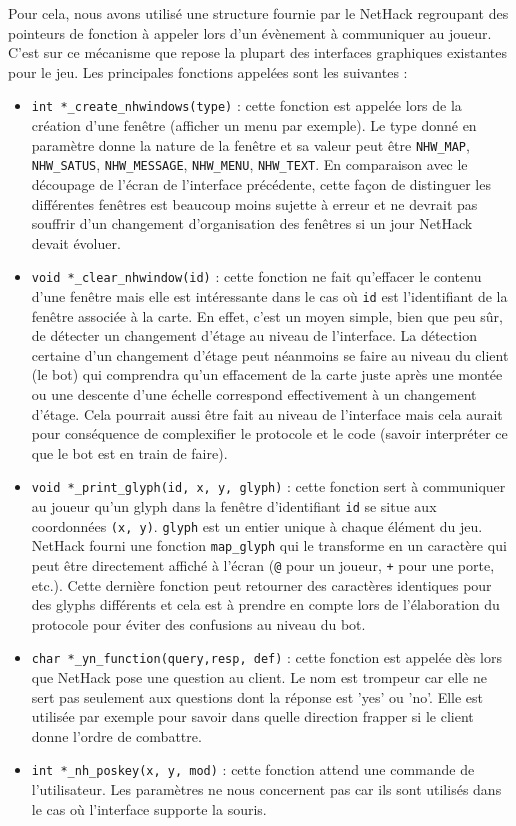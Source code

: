 \documentclass[a4paper,11pt]{article}
\begin{document}
Pour cela, nous avons utilisé une structure fournie par le NetHack regroupant des pointeurs de fonction à appeler lors d'un évènement à communiquer au joueur. C'est sur ce mécanisme que repose la plupart des interfaces graphiques existantes pour le jeu. Les principales fonctions appelées sont les suivantes :
\begin{itemize}
	\item \verb!int *_create_nhwindows(type)! : cette fonction est appelée lors de la création d'une fenêtre (afficher un menu par exemple). Le type donné en paramètre donne la nature de la fenêtre et sa valeur peut être \verb!NHW_MAP!, \verb!NHW_SATUS!, \verb!NHW_MESSAGE!, \verb!NHW_MENU!, \verb!NHW_TEXT!. En comparaison avec le découpage de l'écran de l'interface précédente, cette façon de distinguer les différentes fenêtres est beaucoup moins sujette à erreur et ne devrait pas souffrir d'un changement d'organisation des fenêtres si un jour NetHack devait évoluer.
	\item \verb!void *_clear_nhwindow(id)! : cette fonction ne fait qu'effacer le contenu d'une fenêtre mais elle est intéressante dans le cas où \verb!id! est l'identifiant de la fenêtre associée à la carte. En effet, c'est un moyen simple, bien que peu sûr, de détecter un changement d'étage au niveau de l'interface. La détection certaine d'un changement d'étage peut néanmoins se faire au niveau du client (le bot) qui comprendra qu'un effacement de la carte juste après une montée ou une descente d'une échelle correspond effectivement à un changement d'étage. Cela pourrait aussi être fait au niveau de l'interface mais cela aurait pour conséquence de complexifier le protocole et le code (savoir interpréter ce que le bot est en train de faire).
	\item \verb!void *_print_glyph(id, x, y, glyph)! : cette fonction sert à communiquer au joueur qu'un glyph dans la fenêtre d'identifiant \verb!id! se situe aux coordonnées \verb!(x, y)!. \verb!glyph! est un entier unique à chaque élément du jeu. NetHack fourni une fonction \verb!map_glyph! qui le transforme en un caractère qui peut être directement affiché à l'écran (\verb!@! pour un joueur, \verb!+! pour une porte, etc.). Cette dernière fonction peut retourner des caractères identiques pour des glyphs différents et cela est à prendre en compte lors de l'élaboration du protocole pour éviter des confusions au niveau du bot.
	\item \verb!char *_yn_function(query,resp, def)! : cette fonction est appelée dès lors que NetHack pose une question au client. Le nom est trompeur car elle ne sert pas seulement aux questions dont la réponse est 'yes' ou 'no'. Elle est utilisée par exemple pour savoir dans quelle direction frapper si le client donne l'ordre de combattre.
	\item \verb!int *_nh_poskey(x, y, mod)! : cette fonction attend une commande de l'utilisateur. Les paramètres ne nous concernent pas car ils sont utilisés dans le cas où l'interface supporte la souris.
\end{itemize}
\end{document}
